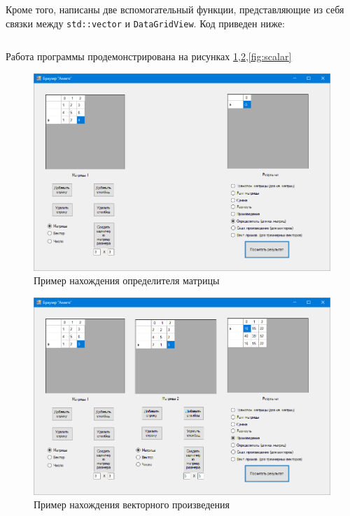 Кроме того, написаны две вспомогательный функции, представляющие из себя связки
между \verb|std::vector| и \verb|DataGridView|. Код приведен ниже:
\inputminted[fontsize=\small, breaklines=true, style=bw, linenos, encoding=cp1251, outencoding=utf8]{cpp}{task6/Misc.h}
Работа программы продемонстрирована на рисунках \ref{fig:det},\ref{fig:vec},\ref{fig:scalar}
\begin{figure}[H]
    \centering
    \includegraphics[scale=0.4]{task6/det.png}
    \caption{Пример нахождения определителя матрицы}
    \label{fig:det}
\end{figure}
\begin{figure}[H]
    \centering
    \includegraphics[scale=0.4]{task6/mult.png}   
    \caption{Пример нахождения векторного произведения}
    \label{fig:vec}
\end{figure}
